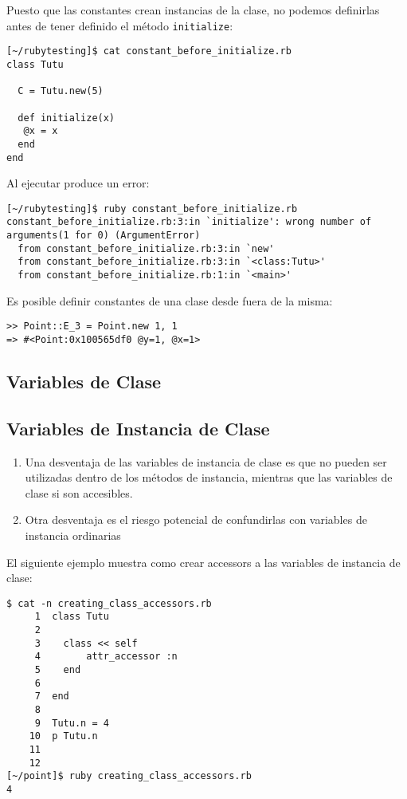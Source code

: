 Puesto que las constantes crean instancias de la clase, no podemos definirlas antes 
de tener definido el método \verb|initialize|:
\begin{verbatim}
[~/rubytesting]$ cat constant_before_initialize.rb 
class Tutu

  C = Tutu.new(5)

  def initialize(x)
   @x = x 
  end
end
\end{verbatim}
Al ejecutar produce un error:
\begin{verbatim}
[~/rubytesting]$ ruby constant_before_initialize.rb 
constant_before_initialize.rb:3:in `initialize': wrong number of arguments(1 for 0) (ArgumentError)
  from constant_before_initialize.rb:3:in `new'
  from constant_before_initialize.rb:3:in `<class:Tutu>'
  from constant_before_initialize.rb:1:in `<main>'
\end{verbatim}
Es posible definir constantes de una clase desde fuera de la misma:
\begin{verbatim}
>> Point::E_3 = Point.new 1, 1
=> #<Point:0x100565df0 @y=1, @x=1>
\end{verbatim}

\subsection{Variables de Clase}

\subsection{Variables de Instancia de Clase}
\begin{enumerate}
\item
Una desventaja de las variables de instancia de clase
es que no pueden ser utilizadas dentro de los métodos de instancia,
mientras que las variables de clase si son accesibles.
\item
Otra desventaja es el riesgo potencial de confundirlas con variables de
instancia ordinarias
\end{enumerate}

El siguiente ejemplo muestra como crear accessors a las variables de instancia
de clase:

\begin{verbatim}
$ cat -n creating_class_accessors.rb 
     1  class Tutu
     2  
     3    class << self
     4        attr_accessor :n
     5    end
     6  
     7  end
     8  
     9  Tutu.n = 4
    10  p Tutu.n
    11  
    12  
[~/point]$ ruby creating_class_accessors.rb 
4

\end{verbatim}

